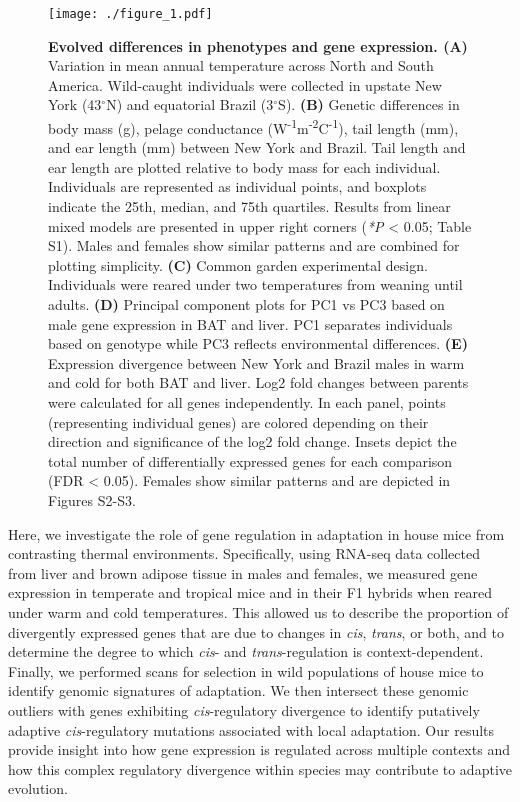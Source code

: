 \documentclass[9pt,twocolumn,twoside,lineno]{pnas-new}
\begin{document}
\begin{figure}[t]
  \texttt{[image: ./figure\_1.pdf]}
  \caption{\textbf{Evolved differences in phenotypes and gene expression. (A)} Variation in mean annual temperature across North and South America. Wild-caught individuals were collected in upstate New York (43$^{\circ}$N) and equatorial Brazil (3$^{\circ}$S). \textbf{(B)} Genetic differences in body mass (g), pelage conductance (W\textsuperscript{-1}m\textsuperscript{-2}C\textsuperscript{-1}), tail length (mm), and ear length (mm) between New York and Brazil. Tail length and ear length are plotted relative to body mass for each individual. Individuals are represented as individual points, and boxplots indicate the 25th, median, and 75th quartiles. Results from linear mixed models are presented in upper right corners (\textit{*P} < 0.05; Table S1). Males and females show similar patterns and are combined for plotting simplicity. \textbf{(C)} Common garden experimental design. Individuals were reared under two temperatures from weaning until adults. \textbf{(D)} Principal component plots for PC1 vs PC3 based on male gene expression in BAT and liver. PC1 separates individuals based on genotype while PC3 reflects environmental differences. \textbf{(E)} Expression divergence between New York and Brazil males in warm and cold for both BAT and liver. Log2 fold changes between parents were calculated for all genes independently. In each panel, points (representing individual genes) are colored depending on their direction and significance of the log2 fold change. Insets depict the total number of differentially expressed genes for each comparison (FDR < 0.05). Females show similar patterns and are depicted in Figures S2-S3.}
\end{figure}
\vspace{-1pt}

Here, we investigate the role of gene regulation in adaptation in house
mice from contrasting thermal environments. Specifically, using RNA-seq
data collected from liver and brown adipose tissue in males and females,
we measured gene expression in temperate and tropical mice and in their
F1 hybrids when reared under warm and cold temperatures. This allowed us
to describe the proportion of divergently expressed genes that are due
to changes in \emph{cis}, \emph{trans}, or both, and to determine the
degree to which \emph{cis}- and \emph{trans}-regulation is
context-dependent. Finally, we performed scans for selection in wild
populations of house mice to identify genomic signatures of adaptation.
We then intersect these genomic outliers with genes exhibiting
\emph{cis}-regulatory divergence to identify putatively adaptive
\emph{cis}-regulatory mutations associated with local adaptation. Our
results provide insight into how gene expression is regulated across
multiple contexts and how this complex regulatory divergence within
species may contribute to adaptive evolution.
\end{document}
